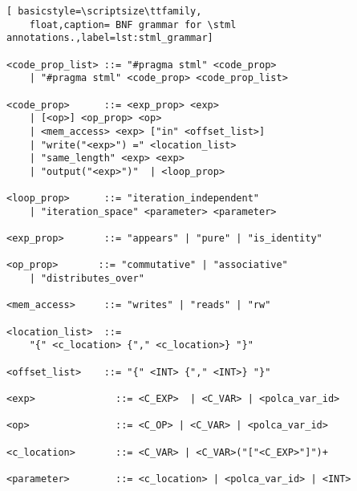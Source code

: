 \documentclass[svgnames,usenames,preprint,nocopyrightspace]{sigplanconf}
\newcommand{\stml}{\textsc{stml}\xspace}
\begin{document}
\begin{lstlisting}[ basicstyle=\scriptsize\ttfamily,
    float,caption= BNF grammar for \stml annotations.,label=lst:stml_grammar]

<code_prop_list> ::= "#pragma stml" <code_prop> 
    | "#pragma stml" <code_prop> <code_prop_list>

<code_prop>      ::= <exp_prop> <exp>
    | [<op>] <op_prop> <op> 
    | <mem_access> <exp> ["in" <offset_list>]
    | "write("<exp>") =" <location_list>
    | "same_length" <exp> <exp> 
    | "output("<exp>")"  | <loop_prop>

<loop_prop>      ::= "iteration_independent"
    | "iteration_space" <parameter> <parameter>

<exp_prop>       ::= "appears" | "pure" | "is_identity"
    
<op_prop>       ::= "commutative" | "associative"
    | "distributes_over"  

<mem_access>     ::= "writes" | "reads" | "rw"

<location_list>  ::= 
    "{" <c_location> {"," <c_location>} "}" 

<offset_list>    ::= "{" <INT> {"," <INT>} "}"

<exp>              ::= <C_EXP>  | <C_VAR> | <polca_var_id>

<op>               ::= <C_OP> | <C_VAR> | <polca_var_id>

<c_location>       ::= <C_VAR> | <C_VAR>("["<C_EXP>"]")+

<parameter>        ::= <c_location> | <polca_var_id> | <INT>
\end{lstlisting}
\end{document}
